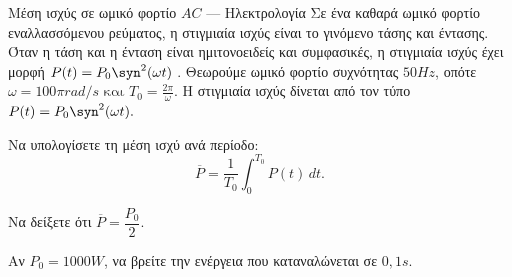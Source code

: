 \begin{problhma}{Μέση ισχύς σε ωμικό φορτίο $AC$ --- Ηλεκτρολογία}
Σε ένα καθαρά ωμικό φορτίο εναλλασσόμενου ρεύματος, η στιγμιαία ισχύς
είναι το γινόμενο τάσης και έντασης. Όταν η τάση και η ένταση είναι
ημιτονοειδείς και συμφασικές, η στιγμιαία ισχύς έχει μορφή
\(P(t)=P_0\syn^2(\omega t)\) \cite{acPowerResistiveLoad}. Θεωρούμε ωμικό φορτίο συχνότητας \(50\si{Hz}\), οπότε $\omega=100\pi\si{rad/s} \text{ και } T_0=\frac{2\pi}{\omega}.$ Η στιγμιαία ισχύς δίνεται από τον τύπο $P(t)=P_0\syn^2(\omega t).$
\begin{alist}
  \item Να υπολογίσετε τη μέση ισχύ ανά περίοδο:
        \[
          \overline{P}
          =
          \frac{1}{T_0}\int_0^{T_0} P(t)\,dt.
        \]
  \item Να δείξετε ότι \(\overline{P}=\dfrac{P_0}{2}\).
  \item Αν \(P_0=1000\si{W}\), να βρείτε την ενέργεια που
        καταναλώνεται σε \(0{,}1\si{s}\).
\end{alist}
\end{problhma}


